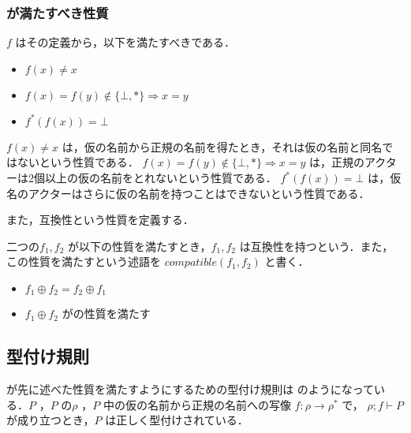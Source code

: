 \subsubsection{\tmp が満たすべき性質}

\tmp $f$ はその定義から，以下を満たすべきである．

\begin{itemize}
  \item $ f(x) \neq x $
  \item $ f(x) = f(y) \notin \{\bot,\ast\} \Rightarrow x = y $
  \item $ f^{*}(f(x)) = \bot $
\end{itemize}

$ f(x) \neq x $ は，仮の名前から正規の名前を得たとき，それは仮の名前と同名ではないという性質である．
$ f(x) = f(y) \notin \{\bot,\ast\} \Rightarrow x = y $ は，正規のアクターは2個以上の仮の名前をとれないという性質である．
$ f^{*}(f(x)) = \bot $ は，仮名のアクターはさらに仮の名前を持つことはできないという性質である．

また，互換性という性質を定義する．

\begin{dfn}
  二つの\tmp $f_1, f_2$ が以下の性質を満たすとき，$f_1,f_2$ は互換性を持つという．また，この性質を満たすという述語を $compatible(f_1,f_2)$ と書く．
  \begin{itemize}
    \item $f_1 \oplus f_2 = f_2 \oplus f_1$
    \item $f_1 \oplus f_2$ が\tmp の性質を満たす
  \end{itemize}
\end{dfn}

\subsection{型付け規則}

\api が先に述べた性質を満たすようにするための型付け規則は  のようになっている．\conf $ P $ ，$ P $ の\recep $ \rho $ ，$ P $ 中の仮の名前から正規の名前への写像 $f : \rho \rightarrow \rho^*$ で， $\rho ; f \vdash P$ が成り立つとき，$ P $ は正しく型付けされている．

